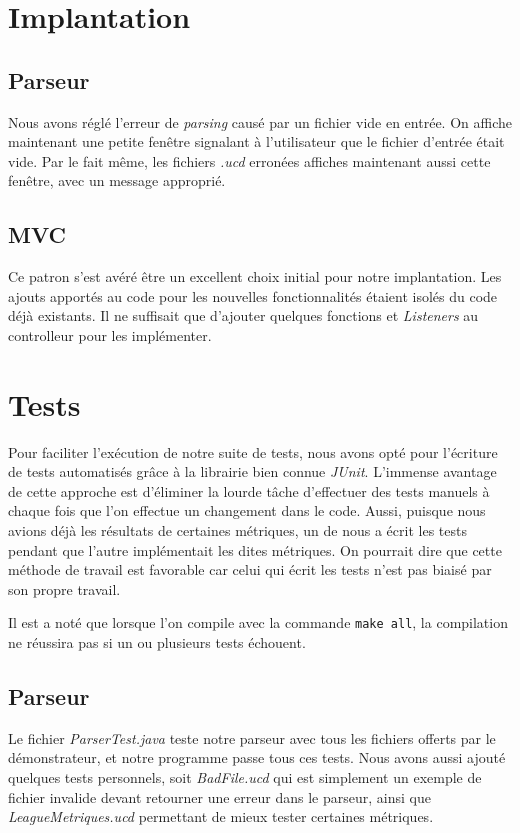 \documentclass[letter,french]{report}
\begin{document}
	\section*{Implantation}
	
	\subsection*{Parseur}
  Nous avons réglé l'erreur de \emph{parsing} causé par un fichier vide en
  entrée. On affiche maintenant une petite fenêtre signalant à l'utilisateur que
  le fichier d'entrée était vide. Par le fait même, les fichiers \emph{.ucd}
  erronées affiches maintenant aussi cette fenêtre, avec un message approprié.
	
	\subsection*{MVC}
  Ce patron s'est avéré être un excellent choix initial pour notre implantation.
  Les ajouts apportés au code pour les nouvelles fonctionnalités étaient isolés
  du code déjà existants. Il ne suffisait que d'ajouter quelques fonctions et
  \emph{Listeners} au controlleur pour les implémenter.
	
	\section*{Tests}
  Pour faciliter l'exécution de notre suite de tests, nous avons opté pour
  l'écriture de tests automatisés grâce à la librairie bien connue \emph{JUnit}.
  L'immense avantage de cette approche est d'éliminer la lourde tâche
  d'effectuer des tests manuels à chaque fois que l'on effectue un changement
  dans le code. Aussi, puisque nous avions déjà les résultats de certaines
  métriques, un de nous a écrit les tests pendant que l'autre implémentait les
  dites métriques. On pourrait dire que cette méthode de travail est favorable
  car celui qui écrit les tests n'est pas biaisé par son propre travail.

  Il est a noté que lorsque l'on compile avec la commande \texttt{make all}, la
  compilation ne réussira pas si un ou plusieurs tests échouent. 

  \subsection{Parseur}
  Le fichier \emph{ParserTest.java} teste notre parseur avec tous les fichiers
  offerts par le démonstrateur, et notre programme passe tous ces tests. Nous
  avons aussi ajouté quelques tests personnels, soit \emph{BadFile.ucd} qui est
  simplement un exemple de fichier invalide devant retourner une erreur dans le
  parseur, ainsi que \emph{LeagueMetriques.ucd} permettant de mieux tester
  certaines métriques.
\end{document}
